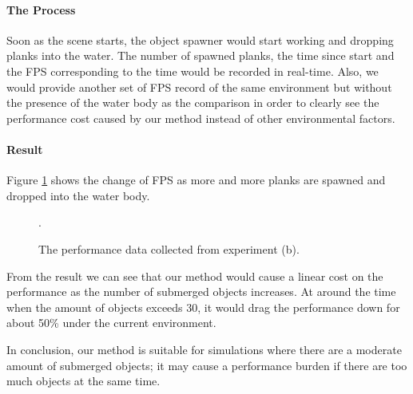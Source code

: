 \paragraph*{The Process}

Soon as the scene starts, the object spawner would start working and dropping planks into the water.
The number of spawned planks, the time since start and the FPS corresponding to the time would be recorded in real-time.
Also, we would provide another set of FPS record of the same environment but without the presence of the water body as the comparison in order to clearly see the performance cost caused by our method instead of other environmental factors.

\paragraph*{Result}

Figure \ref{experiment-spawner} shows the change of FPS as more and more planks are spawned and dropped into the water body.

\begin{figure}[h]
	\centering
	\caption{The performance data collected from experiment (b).}.
	\label{experiment-spawner}
\end{figure}

From the result we can see that our method would cause a linear cost on the performance as the number of submerged objects increases.
At around the time when the amount of objects exceeds 30, it would drag the performance down for about 50\% under the current environment.

In conclusion, our method is suitable for simulations where there are a moderate amount of submerged objects;
it may cause a performance burden if there are too much objects at the same time.
